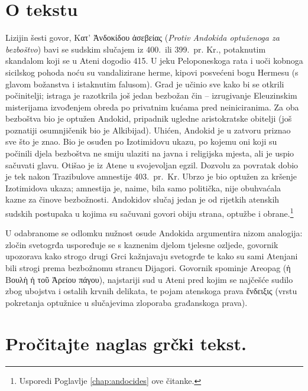 
\section*{O tekstu}

Lizijin šesti govor, \textgreek{Κατ' Ἀνδοκίδου ἀσεβείας} (\textit{Protiv Andokida optuženoga za bezboštvo})  bavi se sudskim slučajem iz 400.\ ili 399.\ pr. Kr., potaknutim skandalom koji se u Ateni dogodio 415. U jeku Peloponeskoga rata i uoči kobnoga sicilskog pohoda noću su vandalizirane herme, kipovi posvećeni bogu Hermesu (s glavom božanstva i istaknutim falusom). Grad je učinio sve kako bi se otkrili počinitelji; istraga je razotkrila još jedan bezbožan čin – izrugivanje Eleuzinskim misterijama izvođenjem obreda po privatnim kućama pred neiniciranima. Za oba bezboštva bio je optužen Andokid, pripadnik ugledne aristokratske obitelji (još poznatiji osumnjičenik bio je Alkibijad). Uhićen, Andokid je u zatvoru priznao sve što je znao. Bio je osuđen po Izotimidovu ukazu, po kojemu oni koji su počinili djela bezboštva ne smiju ulaziti na javna i religijska mjesta, ali je uspio sačuvati glavu. Otišao je iz Atene u svojevoljan egzil. Dozvolu za povratak dobio je tek nakon Trazibulove amnestije 403.\ pr.~Kr. Ubrzo je bio optužen za kršenje Izotimidova ukaza; amnestija je, naime, bila samo politička, nije obuhvaćala kazne za činove bezbožnosti. Andokidov slučaj jedan je od rijetkih atenskih sudskih postupaka u kojima su sačuvani govori obiju strana, optužbe i obrane.\footnote{Usporedi Poglavlje \ref{chap:andocides} ove čitanke.}

U odabranome se odlomku nužnost osude Andokida argumentira nizom analogija: zločin svetogrđa uspoređuje se s kaznenim djelom tjelesne ozljede, govornik upozorava kako strogo drugi Grci kažnjavaju svetogrđe te kako su sami Atenjani bili strogi prema bezbožnomu strancu Dijagori. Govornik spominje Areopag \textgreek{(ἡ Βουλὴ ἡ τοῦ Ἀρείου πάγου),} najstariji sud u Ateni pred kojim se najčešće sudilo zbog ubojstva i ostalih krvnih delikata, te pojam atenskoga prava \textgreek{ἔνδειξις} (vrstu pokretanja optužnice u slučajevima zloporaba građanskoga prava). 



\section*{Pročitajte naglas grčki tekst.}

